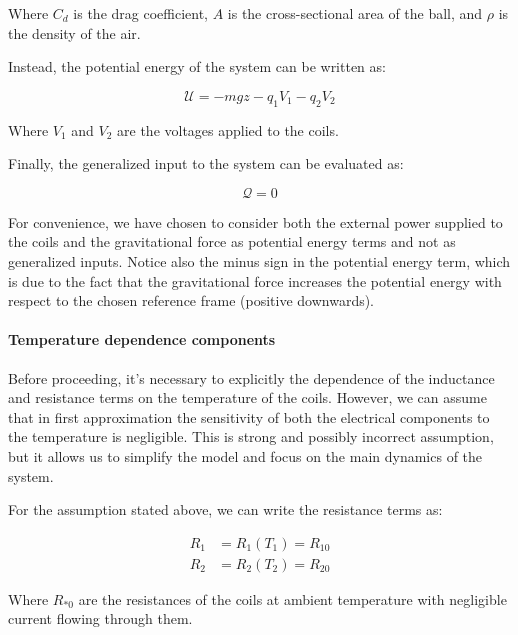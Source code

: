 Where $C_d$ is the drag coefficient, $A$ is the cross-sectional area of the ball, and $\rho$ is the density of the air.

Instead, the potential energy of the system can be written as:

\begin{equation}
    \mathcal{U} = -m g z - q_1 V_1 - q_2 V_2
    \label{eq:potential_energy}
\end{equation}

Where $V_1$ and $V_2$ are the voltages applied to the coils.

Finally, the generalized input to the system can be evaluated as:

\begin{equation}
    \mathcal{Q} = 0
    \label{eq:generalized_input}
\end{equation}

For convenience, we have chosen to consider both the external power supplied to the coils and the gravitational force as potential energy terms and not as generalized inputs.
Notice also the minus sign in the potential energy term, which is due to the fact that the gravitational force increases the potential energy with respect to the chosen reference frame (positive downwards).

\paragraph{Temperature dependence components}

Before proceeding, it's necessary to explicitly the dependence of the inductance and resistance terms on the temperature of the coils.
However, we can assume that in first approximation the sensitivity of both the electrical components to the temperature is negligible.
This is strong and possibly incorrect assumption, but it allows us to simplify the model and focus on the main dynamics of the system.

For the assumption stated above, we can write the resistance terms as:

\begin{equation}
    \begin{aligned}
        R_1 & = R_1(T_1) = R_{10} \\
        R_2 & = R_2(T_2) = R_{20}
    \end{aligned}
    \label{eq:resistance}
\end{equation}

Where $R_{*0}$ are the resistances of the coils at ambient temperature with negligible current flowing through them.

